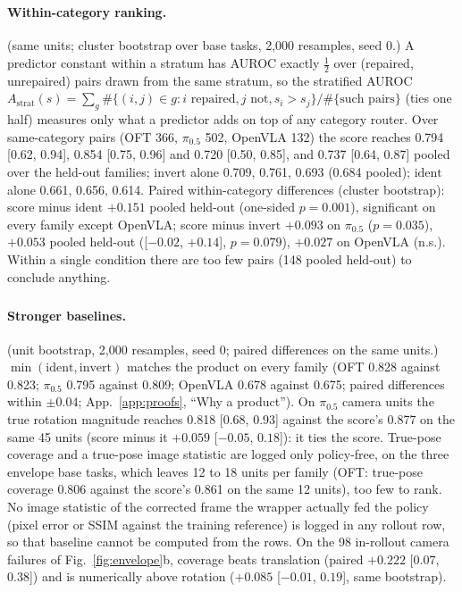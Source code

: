 \documentclass{article}
\newcommand{\ident}{\mathrm{ident}}
\newcommand{\invert}{\mathrm{invert}}
\newcommand{\pihalf}{$\pi_{0.5}$}
\newcommand{\ph}{\textsuperscript{\dag}}
\begin{document}
\paragraph{Within-category ranking\ph.} (same units; cluster bootstrap over
base tasks, 2{,}000 resamples, seed 0.) A predictor constant within a stratum has AUROC exactly $\tfrac12$ over
(repaired, unrepaired) pairs drawn from the same stratum, so the stratified AUROC
$A_{\mathrm{strat}}(s) = \sum_g \#\{(i,j) \in g: i \text{ repaired}, j \text{ not}, s_i > s_j\} / \#\{\text{such pairs}\}$
(ties one half) measures only what a predictor adds on top of any category router. Over same-category pairs (OFT 366,
\pihalf{} 502, OpenVLA 132) the score reaches 0.794 [0.62, 0.94], 0.854 [0.75, 0.96] and 0.720 [0.50, 0.85], and 0.737
[0.64, 0.87] pooled over the held-out families; $\invert$ alone 0.709, 0.761, 0.693 (0.684 pooled); $\ident$ alone
0.661, 0.656, 0.614. Paired within-category differences (cluster bootstrap): score minus $\ident$ $+0.151$ pooled
held-out (one-sided $p = 0.001$), significant on every family except OpenVLA; score minus $\invert$ $+0.093$ on
\pihalf{} ($p = 0.035$), $+0.053$ pooled held-out ([$-0.02$, $+0.14$], $p = 0.079$), $+0.027$ on OpenVLA (n.s.).
Within a single condition there are too few pairs (148 pooled held-out) to conclude anything.

\paragraph{Stronger baselines\ph.} (unit bootstrap, 2{,}000 resamples, seed 0; paired
differences on the same units.) $\min(\ident, \invert)$ matches the product on every family (OFT 0.828 against 0.823;
\pihalf{} 0.795 against 0.809; OpenVLA 0.678 against 0.675; paired differences within $\pm0.04$; App.~\ref{app:proofs},
``Why a product''). On \pihalf{} camera units the true rotation magnitude reaches 0.818 [0.68, 0.93] against the
score's 0.877 on the same 45 units (score minus it $+0.059$ [$-0.05$, $0.18$]): it ties the score. True-pose coverage
and a true-pose image statistic are logged only policy-free, on the three envelope
base tasks, which leaves 12 to 18 units per family (OFT: true-pose coverage 0.806 against the score's 0.861 on the same
12 units), too few to rank. No image statistic of the corrected frame the wrapper actually fed the policy (pixel error
or SSIM against the training reference) is logged in any rollout row, so that baseline cannot be computed from the rows. On the 98 in-rollout camera failures of Fig.~\ref{fig:envelope}b,
coverage beats translation (paired $+0.222$ [$0.07$, $0.38$]) and is numerically above rotation ($+0.085$ [$-0.01$,
$0.19$], same bootstrap).
\end{document}

